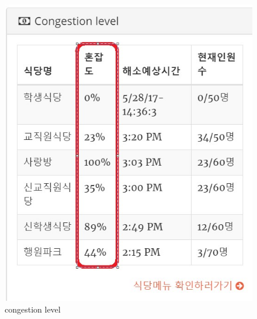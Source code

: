 \documentclass[journal]{IEEEtran}
\begin{document}
\begin{figure}[h]
\centering
\includegraphics[scale=0.5]{1.jpg}
\caption{congestion level}
\label{fig:congestion level}
\end{figure}


\\


\end{document}
